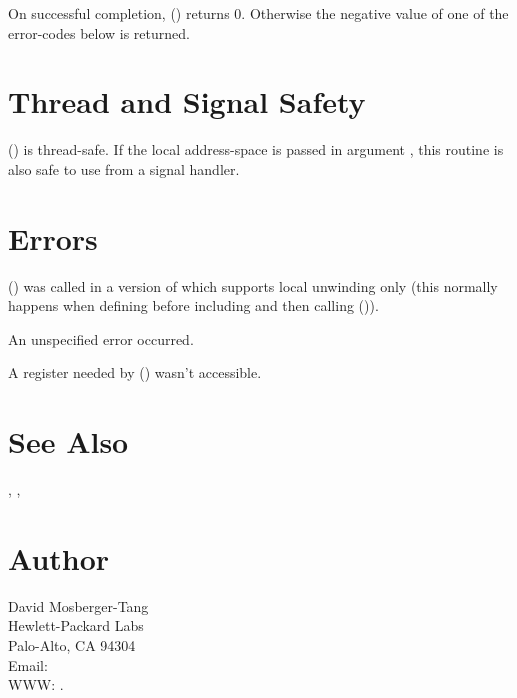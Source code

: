 \documentclass{article}
\begin{document}
On successful completion, () returns 0.
Otherwise the negative value of one of the error-codes below is
returned.

\section{Thread and Signal Safety}

() is thread-safe.  If the local address-space
is passed in argument , this routine is also safe to use from
a signal handler.

\section{Errors}

\begin{Description}
\item[\Const{UNW\_EINVAL}] () was called in a
  version of  which supports local unwinding only
  (this normally happens when defining  before
  including  and then calling
  ()).
\item[\Const{UNW\_EUNSPEC}] An unspecified error occurred.
\item[\Const{UNW\_EBADREG}] A register needed by ()
  wasn't accessible.
\end{Description}

\section{See Also}

, ,

\section{Author}

\noindent
David Mosberger-Tang\\
Hewlett-Packard Labs\\
Palo-Alto, CA 94304\\
Email: \\
WWW: .
\LatexManEnd
\end{document}
